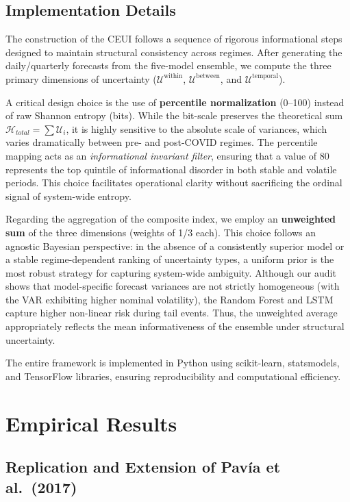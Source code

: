 \documentclass[12pt,a4paper]{article}
\theoremstyle{remark}
\begin{document}
\subsection{Implementation Details}
\label{sec:implementation}

The construction of the CEUI follows a sequence of rigorous informational steps designed to maintain structural consistency across regimes. After generating the daily/quarterly forecasts from the five-model ensemble, we compute the three primary dimensions of uncertainty ($\mathcal{U}^{\text{within}}$, $\mathcal{U}^{\text{between}}$, and $\mathcal{U}^{\text{temporal}}$). 

A critical design choice is the use of \textbf{percentile normalization} (0--100) instead of raw Shannon entropy (bits). While the bit-scale preserves the theoretical sum $\mathcal{H}_{total} = \sum \mathcal{U}_i$, it is highly sensitive to the absolute scale of variances, which varies dramatically between pre- and post-COVID regimes. The percentile mapping acts as an \emph{informational invariant filter}, ensuring that a value of 80 represents the top quintile of informational disorder in both stable and volatile periods. This choice facilitates operational clarity without sacrificing the ordinal signal of system-wide entropy.

Regarding the aggregation of the composite index, we employ an \textbf{unweighted sum} of the three dimensions (weights of 1/3 each). This choice follows an agnostic Bayesian perspective: in the absence of a consistently superior model or a stable regime-dependent ranking of uncertainty types, a uniform prior is the most robust strategy for capturing system-wide ambiguity. Although our audit shows that model-specific forecast variances are not strictly homogeneous (with the VAR exhibiting higher nominal volatility), the Random Forest and LSTM capture higher non-linear risk during tail events. Thus, the unweighted average appropriately reflects the mean informativeness of the ensemble under structural uncertainty.

The entire framework is implemented in Python using scikit-learn, statsmodels, and TensorFlow libraries, ensuring reproducibility and computational efficiency.

\section{Empirical Results}

\subsection{Replication and Extension of Pav\'ia et al.\ (2017)}
\label{sec:pavia_results}
\end{document}
